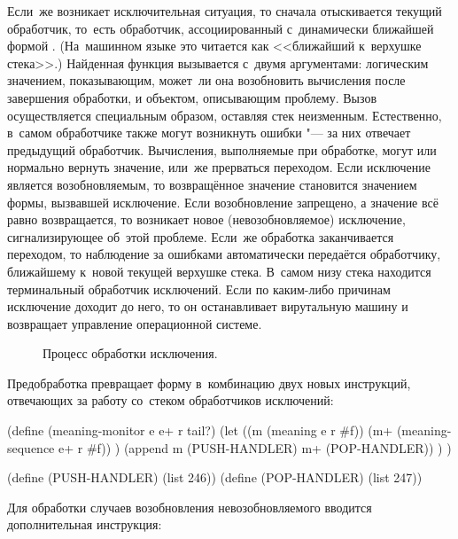 Если~же возникает исключительная ситуация, то сначала отыскивается текущий
обработчик, то~есть обработчик, ассоциированный с~динамически ближайшей формой
. (На~машинном языке это читается как <<ближайший к~верхушке
стека>>.) Найденная функция вызывается с~двумя аргументами: логическим
значением, показывающим, может~ли она возобновить вычисления после завершения
обработки, и объектом, описывающим проблему. Вызов осуществляется специальным
образом, оставляя стек неизменным. Естественно, в~самом обработчике также
могут возникнуть ошибки "--- за них отвечает предыдущий обработчик. Вычисления,
выполняемые при обработке, могут или нормально вернуть значение, или~же
прерваться переходом. Если исключение является возобновляемым, то возвращённое
значение становится значением формы, вызвавшей исключение. Если возобновление
запрещено, а значение всё равно возвращается, то возникает новое
(невозобновляемое) исключение, сигнализирующее об~этой проблеме. Если~же
обработка заканчивается переходом, то наблюдение за ошибками автоматически
передаётся обработчику, ближайшему к~новой текущей верхушке стека. В~самом низу
стека находится терминальный обработчик исключений. Если по каким-либо причинам
исключение доходит до него, то он останавливает вирутальную машину и возвращает
управление операционной системе.

\begin{figure}[!ht]\begin{center}

\end{center}%
\caption{Процесс обработки исключения.}%
\label{compilation/exception/pic:subj}%
\end{figure}


Предобработка превращает форму  в~комбинацию двух новых инструкций,
отвечающих за работу со~стеком обработчиков исключений:

\begin{code:lisp}
(define (meaning-monitor e e+ r tail?)
  (let ((m (meaning e r #f))
        (m+ (meaning-sequence e+ r #f)) )
    (append m (PUSH-HANDLER) m+ (POP-HANDLER)) ) )

(define (PUSH-HANDLER) (list 246))
(define (POP-HANDLER)  (list 247))
\end{code:lisp}

Для обработки случаев возобновления невозобновляемого вводится дополнительная
инструкция:

